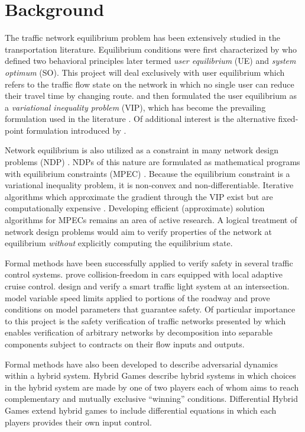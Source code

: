 \section{Background}

The traffic network equilibrium problem has been extensively studied in the transportation literature.
Equilibrium conditions were first characterized by \citet{wardrop1952some} who defined two behavioral principles later termed \textit{user equilibrium} (UE) and \textit{system optimum} (SO).
This project will deal exclusively with user equilibrium which refers to the traffic flow state on the network in which no single user can reduce their travel time by changing route.
\citet{smith1979existence} and \citet{dafermos1980traffic} then formulated the user equilibrium as a \textit{variational inequality problem} (VIP), which has become the prevailing formulation used in the literature \citep{nagurney2009netecon}.
Of additional interest is the alternative fixed-point formulation introduced by \citet{smith1979existence}.

Network equilibrium is also utilized as a constraint in many network design problems (NDP) \citep{sheffi1983optimal}.
NDPs of this nature are formulated as mathematical programs with equilibrium  constraints (MPEC) \citep{luo1996mathematical}.
Because the equilibrium constraint is a variational inequality problem, it is non-convex and non-differentiable.
Iterative algorithms which approximate the gradient through the VIP exist but are computationally expensive \citep{josefsson2007sensitivity}.
Developing efficient (approximate) solution algorithms for MPECs remains an area of active research.
A logical treatment of network design problems would aim to verify properties of the network at equilibrium \textit{without} explicitly computing the equilibrium state. 

Formal methods have been successfully applied to verify safety in several traffic control systems.
\citet{DBLP:conf/fm/LoosPN11} prove collision-freedom in cars equipped with local adaptive cruise control.
\citet{DBLP:conf/itsc/LoosP11} design and verify a smart traffic light system at an intersection.
\citet{DBLP:conf/iccps/MitschLP12} model variable speed limits applied to portions of the roadway and prove conditions on model parameters that guarantee safety.
Of particular importance to this project is the safety verification of traffic networks presented by \citet{DBLP:conf/itsc/MullerMP15} which enables verification of arbitrary networks by decomposition into separable components subject to contracts on their flow inputs and outputs. 

Formal methods have also been developed to describe adversarial dynamics within a hybrid system.
Hybrid Games \citep{Platzer13:dGL} describe hybrid systems in which choices in the hybrid system are made by one of two players each of whom aims to reach complementary and mutually exclusive ``winning'' conditions.
Differential Hybrid Games \citep{DBLP:journals/tocl/Platzer17} extend hybrid games to include differential equations in which each players provides their own input control.